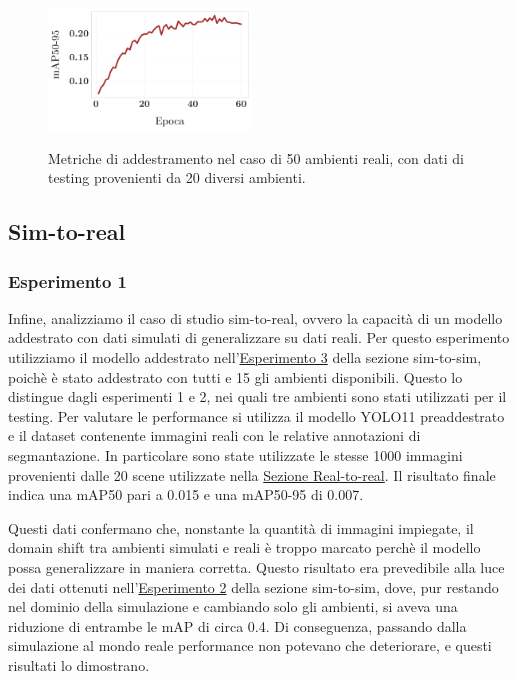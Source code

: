 \documentclass[12pt]{report}
\begin{document}
\begin{figure}[h!]
	\hspace{0.01\textwidth}
	{\includegraphics[width=0.48\textwidth]{images/domain-shift/real-to-real/3/map50-95}}
	\caption{Metriche di addestramento nel caso di 50 ambienti reali, con dati di testing provenienti da 20 diversi ambienti.}
	\label{fig:real-to-real-training-3}
\end{figure}


\subsection{Sim-to-real}
\label{sec:sim_to_real}

\subsubsection{Esperimento 1}
\label{sec:esperimento_ds_3_1}

Infine, analizziamo il caso di studio sim-to-real, ovvero la capacità di un modello addestrato con dati simulati di generalizzare su dati reali. Per questo esperimento utilizziamo il modello addestrato nell'\hyperref[sec:esperimento_ds_1_3]{Esperimento 3} della sezione sim-to-sim, poichè è stato addestrato con tutti e 15 gli ambienti disponibili. Questo lo distingue dagli esperimenti 1 e 2, nei quali tre ambienti sono stati utilizzati per il testing. Per valutare le performance si utilizza il modello YOLO11 preaddestrato e il dataset contenente immagini reali con le relative annotazioni di segmantazione. In particolare sono state utilizzate le stesse 1000 immagini provenienti dalle 20 scene utilizzate nella \hyperref[sec:real_to_real]{Sezione Real-to-real}. Il risultato finale indica una  mAP50 pari a 0.015 e una mAP50-95 di 0.007.

Questi dati confermano che, nonstante la quantità di immagini impiegate, il domain shift tra ambienti simulati e reali è troppo marcato perchè il modello possa generalizzare in maniera corretta. Questo risultato era prevedibile alla luce dei dati ottenuti nell'\hyperref[sec:esperimento_ds_1_2]{Esperimento 2} della sezione sim-to-sim, dove, pur restando nel dominio della simulazione e cambiando solo gli ambienti, si aveva una riduzione di entrambe le mAP di circa 0.4. Di conseguenza, passando dalla simulazione al mondo reale performance non potevano che deteriorare, e questi risultati lo dimostrano.
\end{document}
